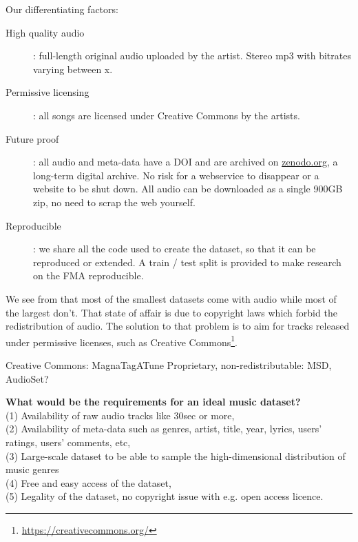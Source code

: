 \documentclass{article}
\begin{document}


Our differentiating factors:
\begin{description}
	\item[High quality audio]: full-length original audio uploaded by the artist. Stereo mp3 with bitrates varying between x.
	\item[Permissive licensing]: all songs are licensed under Creative Commons by the artists.
	\item[Future proof]: all audio and meta-data have a DOI and are archived on \url{zenodo.org}, a long-term digital archive. No risk for a webservice to disappear or a website to be shut down. All audio can be downloaded as a single 900GB zip, no need to scrap the web yourself.
	\item[Reproducible]: we share all the code used to create the dataset, so that it can be reproduced or extended. A train / test split is provided to make research on the FMA reproducible.
\end{description}



We see from  that most of the smallest datasets come with audio while most of the largest don't. That state of affair is due to copyright laws which forbid the redistribution of audio. The solution to that problem is to aim for tracks released under permissive licenses, such as Creative Commons\footnote{\url{https://creativecommons.org/}}.

Creative Commons: MagnaTagATune
Proprietary, non-redistributable: MSD, AudioSet?

\noindent
{\bf What would be the requirements for an ideal music dataset?}  \\
(1) Availability of raw audio tracks like 30sec or more,\\
(2) Availability of meta-data such as genres, artist, title, year, lyrics, users' ratings, users' comments, etc,\\
(3) Large-scale dataset to be able to sample the high-dimensional distribution of music genres\\
(4) Free and easy access of the dataset,\\
(5) Legality of the dataset, no copyright issue with e.g. open access licence.\\
\end{document}
